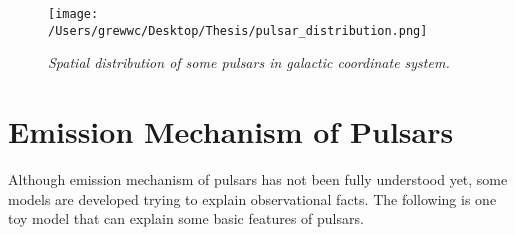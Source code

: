 \documentclass[12pt]{report}
\begin{document}
        \begin{figure}[h]
          \centering
          \texttt{[image: /Users/grewwc/Desktop/Thesis/pulsar\_distribution.png]}
          \caption{\textit{\footnotesize Spatial distribution of some pulsars in galactic coordinate system.}}
          \label{fig:spatial distribution}
        \end{figure}
        


        \iffalse 
        \indent Although the primary focuses of this thesis are observational characteristics such as 
        spectra and light-curves, it is helpful to talk a little about internal structure of pulsars.
        \fi 

        \iffalse
        \indent Many stars are in binary systems so neutron stars can also be isolated or in binary systems. 
        Some of them even have planets. That a pulsar is in binary system provides us a convenient way to 
        measure its mass. 
        \indent 
        \fi
		     
    
             


    \section{Emission Mechanism of Pulsars}
            Although emission mechanism of pulsars has not been fully understood yet, some models are developed 
            trying to 
            explain observational facts. The following is one toy model that can explain some basic features of 
            pulsars.
       
\end{document}
